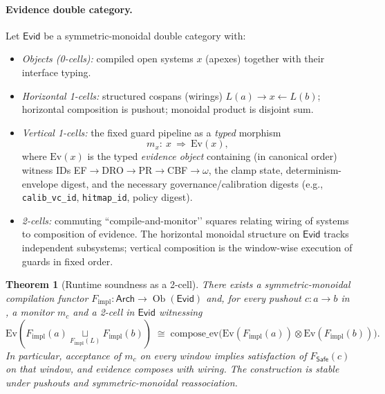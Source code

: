 \documentclass[10pt]{article}
\newtheorem{theorem}{Theorem}
\DeclareMathOperator{\Ob}{Ob}
\newcommand{\Arch}{\mathsf{Arch}}
\newcommand{\Safe}{\mathsf{Safe}}
\newcommand{\Evid}{\mathsf{Evid}} %
\begin{document}
\paragraph{Evidence double category.}
Let $\Evid$ be a symmetric-monoidal double category with:
\begin{itemize}[leftmargin=*]
  \item \emph{Objects (0-cells):} compiled open systems $x$ (apexes) together with their interface typing.
  \item \emph{Horizontal 1-cells:} structured cospans (wirings) $L(a)\to x \leftarrow L(b)$; horizontal composition is pushout; monoidal product is disjoint sum.
  \item \emph{Vertical 1-cells:} the fixed guard pipeline as a \emph{typed} morphism
  \[
    m_x:\ x\ \Rightarrow\ \mathrm{Ev}(x),
  \]
  where $\mathrm{Ev}(x)$ is the typed \emph{evidence object} containing (in canonical order) witness IDs EF$\to$DRO$\to$PR$\to$CBF$\to\omega$, the clamp state, determinism-envelope digest, and the necessary governance/calibration digests (e.g., \texttt{calib\_vc\_id}, \texttt{hitmap\_id}, policy digest).
  \item \emph{2-cells:} commuting “compile-and-monitor’’ squares relating wiring of systems to composition of evidence. The horizontal monoidal structure on $\Evid$ tracks independent subsystems; vertical composition is the window-wise execution of guards in fixed order.
\end{itemize}
\quad
{}

\begin{theorem}[Runtime soundness as a 2-cell]
\label{thm:soundness-square}
There exists a symmetric-monoidal compilation functor
$F_{\mathrm{impl}}:\Arch\to \Ob(\Evid)$ and, for every pushout $c:a\to b$ in \Arch, a monitor $m_c$ and a 2-cell in $\Evid$ witnessing
\[
\mathrm{Ev}\!\left(F_{\mathrm{impl}}(a)\mathop{\sqcup}\limits_{F_{\mathrm{impl}}(L)}F_{\mathrm{impl}}(b)\right)
\;\cong\;
\mathrm{compose\_ev}\!\big(\mathrm{Ev}(F_{\mathrm{impl}}(a))\otimes \mathrm{Ev}(F_{\mathrm{impl}}(b))\big).
\]
In particular, acceptance of $m_c$ on every window implies satisfaction of $F_{\Safe}(c)$ on that window, and evidence \emph{composes with wiring}. The construction is stable under pushouts and symmetric-monoidal reassociation.
\end{theorem}
\end{document}
